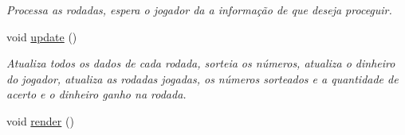\begin{DoxyCompactItemize}
\begin{DoxyCompactList}\small\item\em Processa as rodadas, espera o jogador da a informação de que deseja proceguir. \end{DoxyCompactList}\item 
void \hyperlink{classKeno_1_1KenoManager_aa1ace89723967f0c1a13b208201486e1}{update} ()\hypertarget{classKeno_1_1KenoManager_aa1ace89723967f0c1a13b208201486e1}{}\label{classKeno_1_1KenoManager_aa1ace89723967f0c1a13b208201486e1}

\begin{DoxyCompactList}\small\item\em Atualiza todos os dados de cada rodada, sorteia os números, atualiza o dinheiro do jogador, atualiza as rodadas jogadas, os números sorteados e a quantidade de acerto e o dinheiro ganho na rodada. \end{DoxyCompactList}\item 
void \hyperlink{classKeno_1_1KenoManager_a5fb1330677d6db7d88b291b138ab5f95}{render} ()\hypertarget{classKeno_1_1KenoManager_a5fb1330677d6db7d88b291b138ab5f95}{}\label{classKeno_1_1KenoManager_a5fb1330677d6db7d88b291b138ab5f95}


\end{DoxyCompactItemize}
